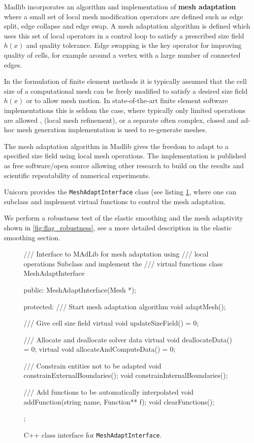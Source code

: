 Madlib incorporates an algorithm and implementation of {\bf mesh
adaptation} where a small set of local mesh modification operators are
defined such as edge split, edge collapse and edge swap. A mesh
adaptation algorithm is defined which uses this set of local operators
in a control loop to satisfy a prescribed size field $h(x)$ and
quality tolerance. Edge swapping is the key operator for improving
quality of cells, for example around a vertex with a large number of
connected edges.

In the formulation of finite element methods it is typically assumed
that the cell size of a computational mesh can be freely modified to
satisfy a desired size field $h(x)$ or to allow mesh motion. In
state-of-the-art finite element software implementations this is
seldom the case, where typically only limited operations are allowed
\cite{BangerthHartmannKanschat2007, COMSOL2009}, (local mesh refinement),
or a separate often complex, closed and ad-hoc mesh generation
implementation is used to re-generate meshes.

The mesh adaptation algorithm in Madlib gives the freedom to adapt to
a specified size field using local mesh operations. The implementation
is published as free software/open source allowing other research to
build on the results and scientific repeatability of numerical
experiments.

Unicorn provides the {\tt MeshAdaptInterface} class (see
listing \ref{code:MeshAdaptInterface}, where one can subclass and
implement virtual functions to control the mesh adaptation.

We perform a robustness test of the elastic smoothing and the mesh
adaptivity shown in \ref{fig:flag_robustness}, see a more detailed
description in the elastic smoothing section.

\begin{figure}[!h]
\begin{c++}
/// Interface to MAdLib for mesh adaptation using
/// local operations Subclass and implement the
/// virtual functions
class MeshAdaptInterface
{
public:
  MeshAdaptInterface(Mesh *);
  
protected:
  /// Start mesh adaptation algorithm
  void adaptMesh();
  
  /// Give cell size field
  virtual void updateSizeField() = 0;
  
  /// Allocate and deallocate solver data
  virtual void deallocateData() = 0;
  virtual void allocateAndComputeData() = 0;
  
  /// Constrain entities not to be adapted
  void constrainExternalBoundaries();
  void constrainInternalBoundaries();
  
  /// Add functions to be automatically interpolated
  void addFunction(string name, Function** f);
  void clearFunctions();
};
\end{c++}
\caption{
C++ class interface for {\tt MeshAdaptInterface}.
}
\label{code:MeshAdaptInterface}
\end{figure}



